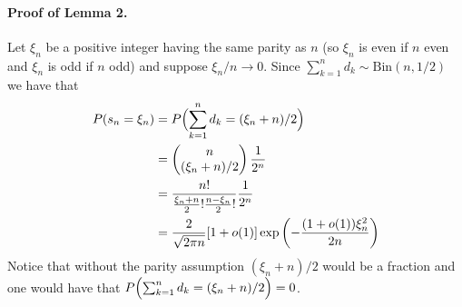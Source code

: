 \documentclass[11pt,letterpaper]{article}
\begin{document}
\paragraph{Proof of Lemma 2.}
Let $\xi_n$ be a positive integer having the same parity as $n$ (so $\xi_n$ is even if $n$ even and  $\xi_n$ is odd if $n$ odd) and suppose $\xi_n/n\rightarrow 0$.
Since $\sum_{k=1}^n d_k\sim \text{Bin}(n,1/2)$ we have that
\begin{align}
P(s_n = \xi_n)
&=P\Bigl(\sum_{k=1}^n d_k = (\xi_n +n)/2\Bigr)\nonumber\\
&=\begin{pmatrix} n \\ (\xi_n +n)/2 \end{pmatrix} \frac{1}{2^n}\nonumber\\
&=\frac{n!}{\frac{\xi_n +n}{2}! \frac{n -\xi_n}{2}! } \frac{1}{2^n}\nonumber\\
& = \frac{2}{\sqrt{2\pi n}} [1+o(1)] \exp\left( - \frac{(1+o(1)) \xi_n^2}{2n} \right)\label{isright}
\end{align}
Notice that without the parity assumption $(\xi_n +n)/2$ would be a fraction and one would have that $P\Bigl(\sum_{k=1}^n d_k = (\xi_n +n)/2\Bigr)=0$.
\end{document}
